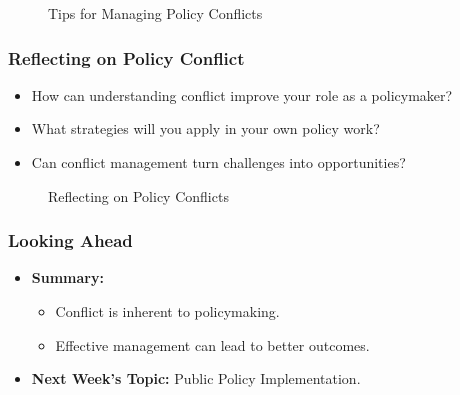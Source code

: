 \documentclass[10pt]{beamer}
\begin{document}
\begin{frame}
\begin{frame}
            \begin{figure}
                \centering
                \caption{Tips for Managing Policy Conflicts}
            \end{figure}
            \end{frame}
            
            \begin{frame}
            \frametitle{Reflecting on Policy Conflict}
            \begin{itemize}
                \item How can understanding conflict improve your role as a policymaker?
                \item What strategies will you apply in your own policy work?
                \item Can conflict management turn challenges into opportunities?
            \end{itemize}
            
            \begin{figure}
                \centering
                \caption{Reflecting on Policy Conflicts}
            \end{figure}
            \end{frame}
            
            \begin{frame}
            \frametitle{Looking Ahead}
            \begin{itemize}
                \item \textbf{Summary:}
                    \begin{itemize}
                        \item Conflict is inherent to policymaking.
                        \item Effective management can lead to better outcomes.
                    \end{itemize}
                \item \textbf{Next Week's Topic:} Public Policy Implementation.
            \end{itemize}
            

\end{frame}
\end{frame}
\end{document}
